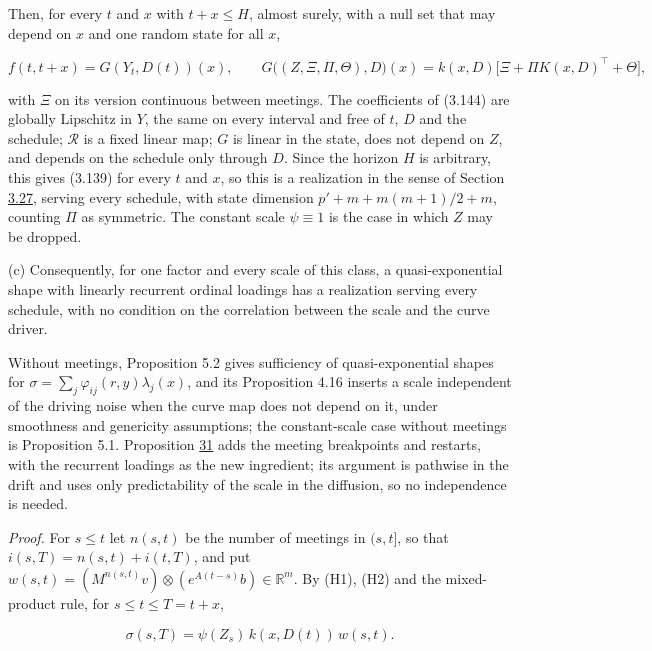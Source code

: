 \documentclass[11pt]{article}
\begin{document}
Then, for every \(t\) and \(x\) with \(t+x\le H\), almost surely, with a null set that may depend on \(x\) and one random state for all \(x\),

\begin{equation*}
f(t,t+x)=G(Y_t,D(t))(x),\qquad G\bigl((Z,\Xi,\Pi,\Theta),D\bigr)(x)=k(x,D)\bigl[\Xi+\Pi K(x,D)^\top+\Theta\bigr], \tag{3.146}\label{eq:3.146}
\end{equation*}

with \(\Xi\) on its version continuous between meetings. The coefficients of (3.144) are globally Lipschitz in \(Y\), the same on every interval and free of \(t\), \(D\) and the schedule; \(\mathcal R\) is a fixed linear map; \(G\) is linear in the state, does not depend on \(Z\), and depends on the schedule only through \(D\). Since the horizon \(H\) is arbitrary, this gives (3.139) for every \(t\) and \(x\), so this is a realization in the sense of Section \hyperref[sec:3.27]{3.27}, serving every schedule, with state dimension \(p'+m+m(m+1)/2+m\), counting \(\Pi\) as symmetric. The constant scale \(\psi\equiv1\) is the case in which \(Z\) may be dropped.

(c) Consequently, for one factor and every scale of this class, a quasi-exponential shape with linearly recurrent ordinal loadings has a realization serving every schedule, with no condition on the correlation between the scale and the curve driver.

Without meetings, \cite{bjork2004finite} Proposition 5.2 gives sufficiency of quasi-exponential shapes for \(\sigma=\sum_j\varphi_{ij}(r,y)\lambda_j(x)\), and its Proposition 4.16 inserts a scale independent of the driving noise when the curve map does not depend on it, under smoothness and genericity assumptions; the constant-scale case without meetings is \cite{bjork2001existence} Proposition 5.1. Proposition \hyperref[res:Proposition-31]{31} adds the meeting breakpoints and restarts, with the recurrent loadings as the new ingredient; its argument is pathwise in the drift and uses only predictability of the scale in the diffusion, so no independence is needed.

\emph{Proof.} For \(s\le t\) let \(n(s,t)\) be the number of meetings in \((s,t]\), so that \(i(s,T)=n(s,t)+i(t,T)\), and put \(w(s,t)=(M^{n(s,t)}v)\otimes(e^{A(t-s)}b)\in\mathbb R^m\). By (H1), (H2) and the mixed-product rule, for \(s\le t\le T=t+x\),

\begin{equation*}
\sigma(s,T)=\psi(Z_s)\,k(x,D(t))\,w(s,t). \tag{3.147}\label{eq:3.147}
\end{equation*}
\end{document}
